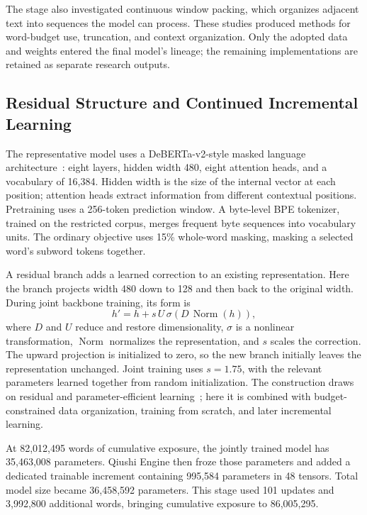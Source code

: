The stage also investigated continuous window packing, which organizes adjacent text into sequences the model can process. These studies produced methods for word-budget use, truncation, and context organization. Only the adopted data and weights entered the final model's lineage; the remaining implementations are retained as separate research outputs.

\subsection{Residual Structure and Continued Incremental Learning}

The representative model uses a DeBERTa-v2-style masked language architecture~\citep{he2021deberta,microsoft2021debertav2}: eight layers, hidden width 480, eight attention heads, and a vocabulary of 16,384. Hidden width is the size of the internal vector at each position; attention heads extract information from different contextual positions. Pretraining uses a 256-token prediction window. A byte-level BPE tokenizer, trained on the restricted corpus, merges frequent byte sequences into vocabulary units. The ordinary objective uses 15\% whole-word masking, masking a selected word's subword tokens together.

A residual branch adds a learned correction to an existing representation. Here the branch projects width 480 down to 128 and then back to the original width. During joint backbone training, its form is
\begin{equation}
h'=h+s\,U\,\sigma\!\left(D\,\operatorname{Norm}(h)\right),
\label{eq:residual}
\end{equation}
where $D$ and $U$ reduce and restore dimensionality, $\sigma$ is a nonlinear transformation, $\operatorname{Norm}$ normalizes the representation, and $s$ scales the correction. The upward projection is initialized to zero, so the new branch initially leaves the representation unchanged. Joint training uses $s=1.75$, with the relevant parameters learned together from random initialization. The construction draws on residual and parameter-efficient learning~\citep{bachlechner2021rezero,houlsby2019adapters}; here it is combined with budget-constrained data organization, training from scratch, and later incremental learning.

At 82,012,495 words of cumulative exposure, the jointly trained model has 35,463,008 parameters. Qiushi Engine then froze those parameters and added a dedicated trainable increment containing 995,584 parameters in 48 tensors. Total model size became 36,458,592 parameters. This stage used 101 updates and 3,992,800 additional words, bringing cumulative exposure to 86,005,295.

